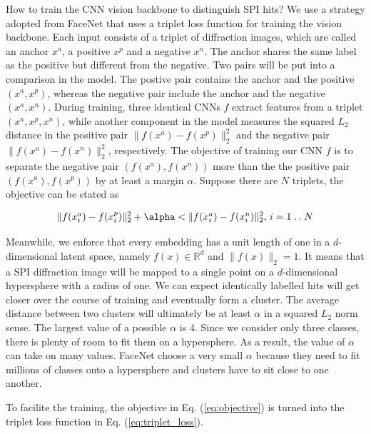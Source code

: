 How to train the CNN vision backbone to distinguish SPI hits?  We use a strategy
adopted from FaceNet \cite{schroffFaceNetUnifiedEmbedding2015} that uses a
triplet loss function for training the vision backbone.  Each input consists of
a triplet of diffraction images, which are called an anchor $x^a$, a positive
$x^p$ and a negative $x^n$. The anchor shares the same label as the positive but
different from the negative.  Two pairs will be put into a comparison in the
model. The postive pair contains the anchor and the positive $(x^a, x^p)$,
whereas the negative pair include the anchor and the negative $(x^a, x^n)$.
During training, three identical CNNs $f$ extract features from a triplet $(x^a,
x^p, x^n)$, while another component in the model measures the squared $L_2$
distance in the positive pair $\|f(x^a) - f(x^p)\|_2^2$ and the negative pair
$\|f(x^a) - f(x^n) \|_2^2$, respectively.  The objective of training our CNN $f$
is to separate the negative pair $(f(x^a), f(x^n))$ more than the the positive
pair $(f(x^a), f(x^p))$ by at least a margin $\alpha$.  Suppose there are $N$
triplets, the objective can be stated as 

\newcommand{\isep}{\mathrel{{.}\,{.}}\nobreak}
\begin{equation} \label{eq:objective}
    \begin{array}{l}
       \|f(x_i^a) - f(x_i^p)\|_2^2 + \alpha < \|f(x_i^a) - f(x_i^n)\|_2^2, \, i = 1 \isep N
    \end{array}
\end{equation}

Meanwhile, we enforce that every embedding has a unit length of one in a
$d$-dimensional latent space, namely $f(x) \in \mathbb{R}^d$ and $\|f(x)
\|_2=1$. It means that a SPI diffraction image will be mapped to a single point
on a $d$-dimensional hypersphere with a radius of one.  We can expect
identically labelled hits will get closer over the course of training and
eventually form a cluster.  The average distance between two clusters will
ultimately be at least $\alpha$ in a squared $L_2$ norm sense. The largest value
of a possible $\alpha$ is 4. Since we consider only three classes, there is
plenty of room to fit them on a hypersphere.  As a result, the value of $\alpha$
can take on many values.  FaceNet choose a very small $\alpha$ because they need
to fit millions of classes onto a hypersphere and clusters have to sit close to
one another.  

To facilite the training, the objective in Eq. (\ref{eq:objective}) is turned into the
triplet loss function in Eq. (\ref{eq:triplet_loss}).

